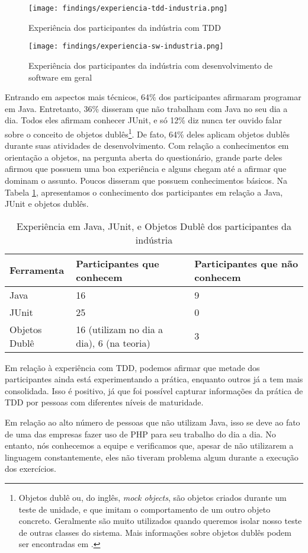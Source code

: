 \begin{figure}[h!]
  \centering
  \texttt{[image: findings/experiencia-tdd-industria.png]}
  \caption{Experiência dos participantes da indústria com TDD}
  \label{fig:exp-tdd-industria}
\end{figure}

\begin{figure}[h!]
  \centering
  \texttt{[image: findings/experiencia-sw-industria.png]}
  \caption{Experiência dos participantes da indústria com desenvolvimento de software em geral}
  \label{fig:exp-sw-industria}
\end{figure}

Entrando em aspectos mais técnicos, 64\% dos participantes afirmaram programar em Java. Entretanto,
36\% disseram que não trabalham com Java no seu dia a dia. Todos eles afirmam conhecer JUnit,
e só 12\% diz nunca ter ouvido falar sobre o conceito de objetos dublês\footnote{Objetos dublê ou, do inglês, 
\textit{mock objects}, são objetos criados durante um teste de unidade, e que imitam o comportamento de um
outro objeto concreto. Geralmente são muito utilizados quando queremos isolar nosso teste de outras classes
do sistema. Mais informações sobre objetos dublês podem ser encontradas em \cite{mocks}.}. De fato, 64\% deles
aplicam objetos dublês durante suas atividades de desenvolvimento. Com relação a conhecimentos
em orientação a objetos, na pergunta aberta do questionário, grande parte deles 
afirmou que possuem uma boa experiência e alguns
chegam até a afirmar que dominam o assunto. Poucos disseram que possuem conhecimentos
básicos. Na Tabela \ref{tab:exp-industria},
apresentamos o conhecimento dos participantes em relação a Java, JUnit e objetos dublês.


\begin{table}
	\begin{tabular}{ | p{5cm} | p{5cm} | p{5cm} | }
		\hline
		Ferramenta & Participantes que conhecem & Participantes que não conhecem\\
		\hline
		Java & 16 & 9\\
		JUnit & 25 & 0\\
		Objetos Dublê & 16 (utilizam no dia a dia), 6 (na teoria) & 3\\
		\hline
	\end{tabular}
	\caption{Experiência em Java, JUnit, e Objetos Dublê dos participantes da indústria}
	\label{tab:exp-industria}
\end{table}

Em relação à experiência com TDD,
podemos afirmar que metade dos participantes ainda está experimentando a prática, enquanto
outros já a tem mais consolidada. Isso é positivo, já que foi possível capturar informações
da prática de TDD por pessoas com diferentes níveis de maturidade.

Em relação ao alto número de pessoas que não utilizam Java, isso se deve ao fato de uma das
empresas fazer uso de PHP para seu trabalho do dia a dia. No entanto, nós conhecemos a equipe
e verificamos que, apesar de não utilizarem a linguagem constantemente, eles não tiveram
problema algum durante a execução dos exercícios.